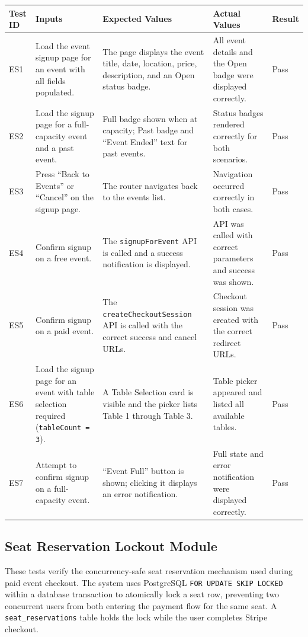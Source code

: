 \documentclass[12pt, titlepage]{article}
\begin{document}
{\small
\setlength{\tabcolsep}{4pt}
\begin{tabularx}{\textwidth}{L{1.6cm}Y Y Y L{1.4cm}}
\toprule
\textbf{Test ID} & \textbf{Inputs} & \textbf{Expected Values} & \textbf{Actual Values} & \textbf{Result} \\
\midrule
ES1 & Load the event signup page for an event with all fields populated. & The page displays the event title, date, location, price, description, and an Open status badge. & All event details and the Open badge were displayed correctly. & Pass \\
ES2 & Load the signup page for a full-capacity event and a past event. & Full badge shown when at capacity; Past badge and ``Event Ended'' text for past events. & Status badges rendered correctly for both scenarios. & Pass \\
ES3 & Press ``Back to Events'' or ``Cancel'' on the signup page. & The router navigates back to the events list. & Navigation occurred correctly in both cases. & Pass \\
ES4 & Confirm signup on a free event. & The \texttt{signupForEvent} API is called and a success notification is displayed. & API was called with correct parameters and success was shown. & Pass \\
ES5 & Confirm signup on a paid event. & The \texttt{createCheckoutSession} API is called with the correct success and cancel URLs. & Checkout session was created with the correct redirect URLs. & Pass \\
ES6 & Load the signup page for an event with table selection required (\texttt{tableCount = 3}). & A Table Selection card is visible and the picker lists Table 1 through Table 3. & Table picker appeared and listed all available tables. & Pass \\
ES7 & Attempt to confirm signup on a full-capacity event. & ``Event Full'' button is shown; clicking it displays an error notification. & Full state and error notification were displayed correctly. & Pass \\
\bottomrule
\end{tabularx}
}

\subsection{Seat Reservation Lockout Module}

These tests verify the concurrency-safe seat reservation mechanism used during paid event checkout. The system uses PostgreSQL \texttt{FOR UPDATE SKIP LOCKED} within a database transaction to atomically lock a seat row, preventing two concurrent users from both entering the payment flow for the same seat. A \texttt{seat\_reservations} table holds the lock while the user completes Stripe checkout.
\end{document}
